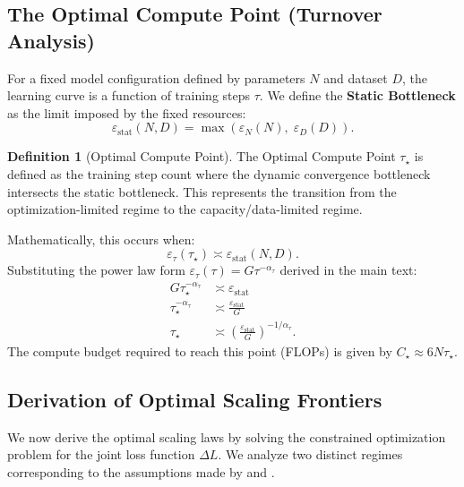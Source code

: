 \documentclass{article}
\theoremstyle{plain}
\theoremstyle{definition}
\newtheorem{definition}[theorem]{Definition}
\theoremstyle{remark}
\begin{document}
\subsection{The Optimal Compute Point (Turnover Analysis)}
\label{app:turnover_analysis}

For a fixed model configuration defined by parameters $N$ and dataset $D$, the learning curve is a function of training steps $\tau$. We define the \textbf{Static Bottleneck} as the limit imposed by the fixed resources:
\begin{equation*}
    \varepsilon_{\text{stat}}(N,D) = \max\left( \varepsilon_N(N), \; \varepsilon_D(D) \right).
\end{equation*}

\begin{definition}[Optimal Compute Point]
The Optimal Compute Point $\tau_\star$ is defined as the training step count where the dynamic convergence bottleneck intersects the static bottleneck. This represents the transition from the optimization-limited regime to the capacity/data-limited regime.
\end{definition}

Mathematically, this occurs when:
\begin{equation*}
    \varepsilon_\tau(\tau_\star) \asymp \varepsilon_{\text{stat}}(N,D).
\end{equation*}
Substituting the power law form $\varepsilon_\tau(\tau) = G \tau^{-\alpha_\tau}$ derived in the main text:
\begin{align*}
    G \tau_\star^{-\alpha_\tau} &\asymp \varepsilon_{\text{stat}} \\
    \tau_\star^{-\alpha_\tau} &\asymp \frac{\varepsilon_{\text{stat}}}{G} \\
    \tau_\star &\asymp \left( \frac{\varepsilon_{\text{stat}}}{G} \right)^{-1/\alpha_\tau}.
\end{align*}
The compute budget required to reach this point (FLOPs) is given by $C_\star \approx 6 N \tau_\star$.

\subsection{Derivation of Optimal Scaling Frontiers}
\label{app:optimal_derivations}

We now derive the optimal scaling laws by solving the constrained optimization problem for the joint loss function $\Delta L$. We analyze two distinct regimes corresponding to the assumptions made by \citet{kaplan2020scalinglawsneurallanguage} and \citet{hoffmann2022trainingcomputeoptimallargelanguage}.
\end{document}
